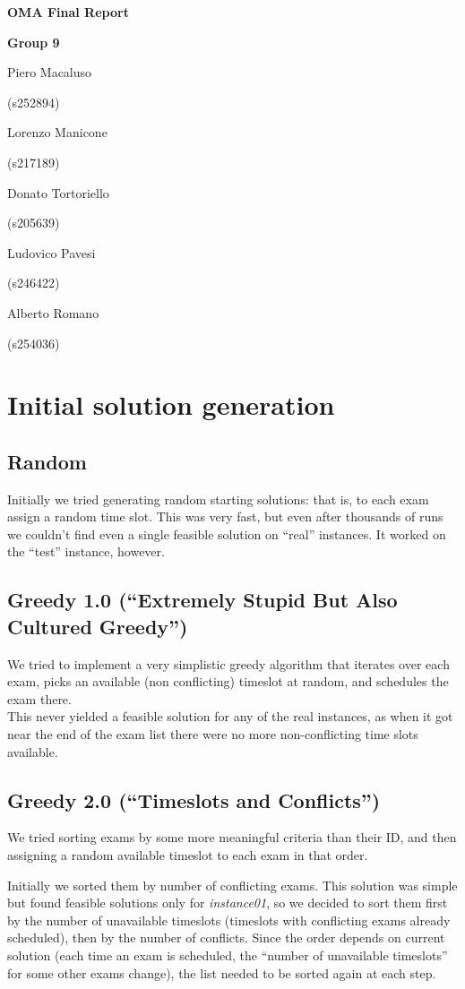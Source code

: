 \documentclass[11pt, a4paper, leqno]{article}
\newcommand{\nome}[2]{
	\begin{minipage}[t]{0.185\linewidth}
		\centering #1\par
		\centering\small (#2)\par
	\end{minipage}
}
\begin{document}
	
	\begin{center}
		{\huge\textbf{OMA Final Report}}\par
		\vspace{0.3em}
		{\large\textbf{Group 9}}\par
		\vspace{1em}
		\nome{Piero Macaluso}{s252894}
		\nome{Lorenzo Manicone}{s217189}
		\nome{Donato Tortoriello}{s205639}
		\nome{Ludovico Pavesi}{s246422}
		\nome{Alberto Romano}{s254036} %
	\end{center}
	
	\section{Initial solution generation}
	
	\subsection{Random}
	
	Initially we tried generating random starting solutions: that is, to each exam assign a random time slot. This was very fast, but even after thousands of runs we couldn't find even a single feasible solution on ``real'' instances. It worked on the ``test'' instance, however.
	
	\subsection{Greedy 1.0 (``Extremely Stupid But Also Cultured Greedy'')}
	
	We tried to implement a very simplistic greedy algorithm that iterates over each exam, picks an available (non conflicting) timeslot at random, and schedules the exam there.\\
	This never yielded a feasible solution for any of the real instances, as when it got near the end of the exam list there were no more non-conflicting time slots available.
	
	\subsection{Greedy 2.0 (``Timeslots and Conflicts'')}
	
	We tried sorting exams by some more meaningful criteria than their ID, and then assigning a random available timeslot to each exam in that order.
	
	Initially we sorted them by number of conflicting exams. This solution was simple but found feasible solutions only for \textit{instance01}, so we decided to sort them first by the number of unavailable timeslots (timeslots with conflicting exams already scheduled), then by the number of conflicts. Since the order depends on current solution (each time an exam is scheduled, the ``number of unavailable timeslots'' for some other exams change), the list needed to be sorted again at each step.
	
\end{document}
